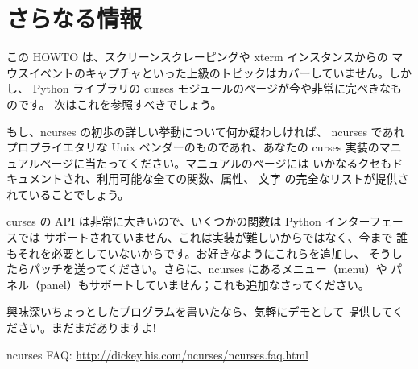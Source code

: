 \documentclass{howto}
\begin{document}
\section{さらなる情報}

この HOWTO は、スクリーンスクレーピングや xterm インスタンスからの
マウスイベントのキャプチャといった上級のトピックはカバーしていません。しかし、
Python ライブラリの curses モジュールのページが今や非常に完ぺきなものです。
次はこれを参照すべきでしょう。

もし、ncurses の初歩の詳しい挙動について何か疑わしければ、
ncurses であれプロプライエタリな Unix ベンダーのものであれ、あなたの 
curses 実装のマニュアルページに当たってください。マニュアルのページには
いかなるクセもドキュメントされ、利用可能な全ての関数、属性、 文字
の完全なリストが提供されていることでしょう。

curses の API は非常に大きいので、いくつかの関数は Python インターフェースでは
サポートされていません、これは実装が難しいからではなく、今まで
誰もそれを必要としていないからです。お好きなようにこれらを追加し、
そうしたらパッチを送ってください。さらに、ncurses にあるメニュー（menu）や
パネル（panel）もサポートしていません；これも追加なさってください。

興味深いちょっとしたプログラムを書いたなら、気軽にデモとして
提供してください。まだまだありますよ!

ncurses FAQ: \url{http://dickey.his.com/ncurses/ncurses.faq.html}
\end{document}
